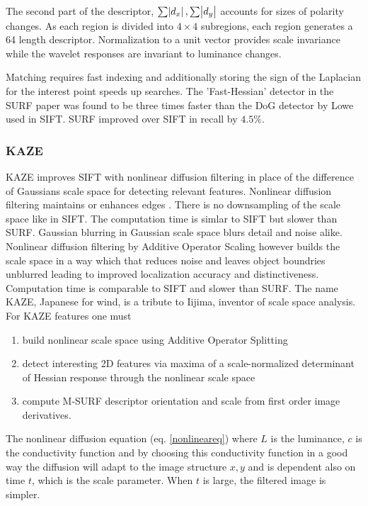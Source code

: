 \documentclass[english,12pt,a4paper,pdftex,elec,utf8]{aaltothesis}
\begin{document}
The second part of the descriptor, $\sum \abs{d_x}, \sum \abs{d_y}$ accounts for sizes of polarity changes. As each region is divided into $4 \times 4$ subregions, each region generates a 64 length descriptor. Normalization to a unit vector provides scale invariance while the wavelet responses are invariant to luminance changes. \cite{Bay2006}

Matching requires fast indexing and additionally storing the sign of the Laplacian for the interest point speeds up searches. The 'Fast-Hessian' detector in the SURF paper was found to be three times faster than the DoG detector by Lowe used in SIFT. SURF improved over SIFT in recall by $4.5\%$. \cite{Bay2006}

\subsubsection{KAZE}
KAZE improves SIFT with nonlinear diffusion filtering in place of the difference of Gaussians scale space for detecting relevant features. Nonlinear diffusion filtering maintains or enhances edges \cite{Weickert1998}. There is no downsampling of the scale space like in SIFT. The computation time is simlar to SIFT but slower than SURF. Gaussian blurring in Gaussian scale space blurs detail and noise alike. Nonlinear diffusion filtering by Additive Operator Scaling however builds the scale space in a way which that reduces noise and leaves object boundries unblurred leading to improved localization accuracy and distinctiveness. Computation time is comparable to SIFT and slower than SURF. The name KAZE, Japanese for wind, is a tribute to Iijima, inventor of scale space analysis. For KAZE features one must

\begin{enumerate}
\item build nonlinear scale space using Additive Operator Splitting
\item detect interesting 2D features via maxima of a scale-normalized determinant of Hessian response through the nonlinear scale space
\item compute M-SURF descriptor orientation and scale from first order image derivatives.
\end{enumerate}

The nonlinear diffusion equation (eq. \ref{nonlineareq}) where $L$ is the luminance, $c$ is the conductivity function and by choosing this conductivity function in a good way the diffusion will adapt to the image structure $x, y$ and is dependent also on time $t$, which is the scale parameter. When $t$ is large, the filtered image is simpler. \cite{Alcantarilla2013}
\end{document}
